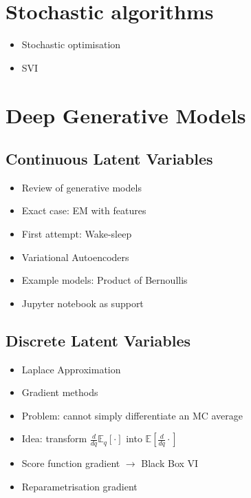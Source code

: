 \documentclass[11pt, a4paper]{article}
\begin{document}
\section{Stochastic algorithms}

\begin{itemize}
	\item Stochastic optimisation \citep{RobbinsEtAl:1951}
	\item SVI \citep{HoffmanEtAl:2013}
\end{itemize}

\section{Deep Generative Models}
\subsection{Continuous Latent Variables}
\begin{itemize}
\item Review of generative models
\item Exact case: EM with features \citep{BergkirkpatrickEtAl:2010}
\item First attempt: Wake-sleep \citep{HintonEtAl:1995}
\item Variational Autoencoders \citep{KingmaWelling:2013, RezendeEtAl:2014}
\item Example models: Product of Bernoullis
\item Jupyter notebook as support
\end{itemize}

\subsection{Discrete Latent Variables}
\begin{itemize}
\item Laplace Approximation 
\item Gradient methods
\item Problem: cannot simply differentiate an MC average
\item Idea: transform $ \frac{d}{dq} \mathbb{E}_{q}[\cdot] $ into $ \mathbb{E}[\frac{d}{dq}\cdot] $
\item Score function gradient $ \rightarrow $ Black Box VI \citep{PaisleyEtAl:2012, RanganathEtAl:2014}
\item Reparametrisation gradient \citep{KingmaWelling:2013, RezendeEtAl:2014, TitsiasLazarogredilla:2014}
\end{itemize}
\end{document}
